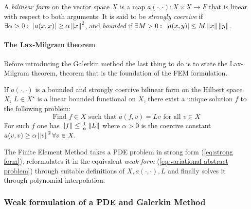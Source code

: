 A \textit{bilinear form} on the vector space $X$ is a map $a(\cdot, \cdot): X\times X\to F$ that is linear with respect to both arguments. It is said to be \textit{strongly coercive} if \\
$\exists\alpha>0:\ |a(x, x)|\geq \alpha \left\lVert x\right\rVert^2$, and \textit{bounded} if $\exists M>0:\ |a(x, y)|\leq M \left\lVert x\right\rVert \left\lVert y\right\rVert$.

\paragraph{The Lax-Milgram theorem}
Before introducing the Galerkin method the last thing to do is to state the Lax-Milgram theorem, theorem that is the foundation of the FEM formulation.
\vspace{0.5cm}
\begin{theorem}
	If \(a(\cdot, \cdot)\) is a bounded and strongly coercive bilinear form on the Hilbert space \(X\),  $L\in X^\star$ is a linear bounded functional on $X$, there exist a unique solution $f$ to the following problem:
	\begin{equation}\label{eq:variational abstract problem}
	\text{Find }f\in X\text{ such that } a(f, v)=Lv \text{ for all } v \in X
	\end{equation}
	For such \(f\) one has \(\|f\| \leq \frac{1}{\alpha}\left\lVert L\right\rVert\) where \(\alpha>0\) is the coercive constant \\\(a(v, v) \geq \alpha\left\lVert v\right\rVert^{2} \forall v \in X.\)
\end{theorem} 
\vspace{0.5cm}
The Finite Element Method takes a PDE problem in strong form (\ref{eq:strong form}), reformulates it in the equivalent \textit{weak form} (\ref{eq:variational abstract problem}) through suitable definitions of $X, a(\cdot, \cdot), L$ and finally solves it through polynomial interpolation.
\subsubsection{Weak formulation of a PDE and Galerkin Method}

